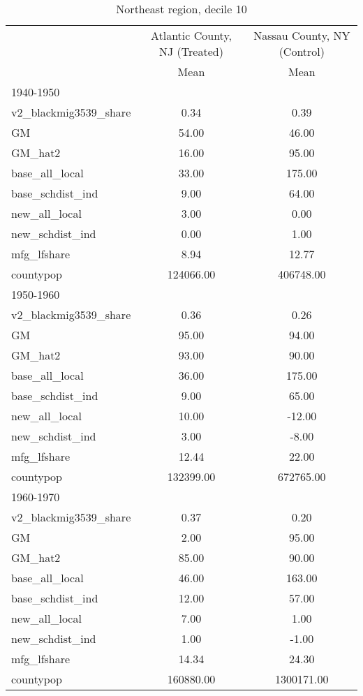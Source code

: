 \begin{table}[htbp]\centering
\def\sym#1{\ifmmode^{#1}\else\(^{#1}\)\fi}
\caption{Northeast region, decile 10 \label{tab1}}
\begin{tabular}{l*{2}{c}}
\toprule
                    &\multicolumn{1}{c}{Atlantic County, NJ (Treated)}&\multicolumn{1}{c}{Nassau County, NY (Control)}\\
                    &        Mean&        Mean\\
\midrule
1940-1950           &            &            \\
v2\_blackmig3539\_share&        0.34&        0.39\\
GM                  &       54.00&       46.00\\
GM\_hat2             &       16.00&       95.00\\
base\_all\_local      &       33.00&      175.00\\
base\_schdist\_ind    &        9.00&       64.00\\
new\_all\_local       &        3.00&        0.00\\
new\_schdist\_ind     &        0.00&        1.00\\
mfg\_lfshare         &        8.94&       12.77\\
countypop           &   124066.00&   406748.00\\
\midrule
1950-1960           &            &            \\
v2\_blackmig3539\_share&        0.36&        0.26\\
GM                  &       95.00&       94.00\\
GM\_hat2             &       93.00&       90.00\\
base\_all\_local      &       36.00&      175.00\\
base\_schdist\_ind    &        9.00&       65.00\\
new\_all\_local       &       10.00&      -12.00\\
new\_schdist\_ind     &        3.00&       -8.00\\
mfg\_lfshare         &       12.44&       22.00\\
countypop           &   132399.00&   672765.00\\
\midrule
1960-1970           &            &            \\
v2\_blackmig3539\_share&        0.37&        0.20\\
GM                  &        2.00&       95.00\\
GM\_hat2             &       85.00&       90.00\\
base\_all\_local      &       46.00&      163.00\\
base\_schdist\_ind    &       12.00&       57.00\\
new\_all\_local       &        7.00&        1.00\\
new\_schdist\_ind     &        1.00&       -1.00\\
mfg\_lfshare         &       14.34&       24.30\\
countypop           &   160880.00&  1300171.00\\
\bottomrule
\end{tabular}
\end{table}
